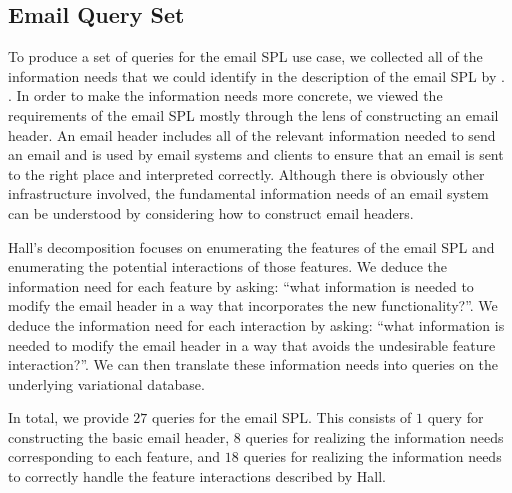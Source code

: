 \subsection{Email Query Set}
\label{sec:enron-qs}


To produce a set of queries for the email SPL use case, we collected all of
the information needs that we could identify in the description of the email
SPL by \cite{Hall05}. . In order to make the information needs more concrete, we
viewed the requirements of the email SPL mostly through the lens of
constructing an email header.
%
An email header includes all of the relevant information needed to send an
email and is used by email systems and clients to ensure that an email is sent to
the right place and interpreted correctly. 
%
Although there is obviously other infrastructure involved, the fundamental
information needs of an email system can be understood by considering how to
construct email headers.


Hall's decomposition focuses on enumerating the features of the email SPL and
enumerating the potential interactions of those features.
%
We deduce the information need for each feature by asking: ``what information
is needed to modify the email header in a way that incorporates the new
functionality?''. We deduce the information need for each interaction by
asking: ``what information is needed to modify the email header in a way that
avoids the undesirable feature interaction?''.
%
We can then translate these information needs into queries on the underlying
variational database.


In total, we provide $27$ queries for the email SPL.
%
%
This consists of $1$ query for constructing the basic email header, $8$ queries
for realizing the information needs corresponding to each feature, and $18$
queries for realizing the information needs to correctly handle the feature
interactions described by Hall.


